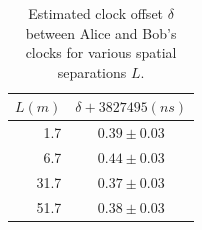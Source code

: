 \documentclass[aps,pra,onecolumn, superscriptaddress]{revtex4}
\begin{document}
\begin{table}[htbp] 
\centering
  \begin{tabular}{r|c}
  $L(m)$ & $\delta + 3827495(ns)$\\
  \hline
   1.7 & $0.39\pm0.03$\\
   6.7 & $0.44\pm0.03$ \\
   31.7 & $0.37\pm0.03$\\
   51.7 & $0.38\pm0.03$
  \end{tabular}
\caption{\label{table:offsets}Estimated clock offset $\delta$ between Alice and Bob's clocks for various spatial separations $L$.}
\end{table}

     
\end{document}
